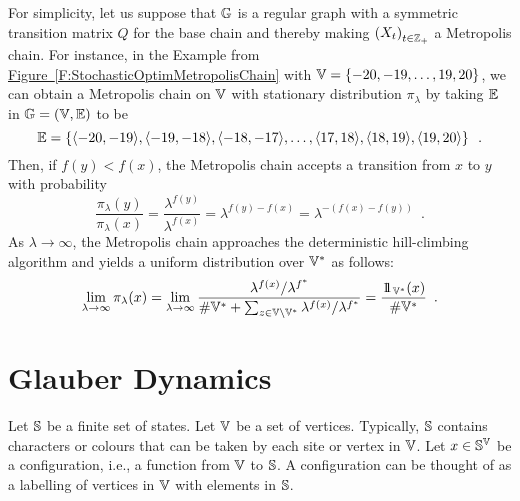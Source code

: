 \begin{example}
For simplicity, let us suppose that $\mathbb{G}$ is a regular graph with a symmetric transition matrix $Q$ for the base chain and thereby making $\left(X_t\right)_{t \in \mathbb{Z}_+}$ a Metropolis chain.  
For instance, in the Example from \hyperref[F:StochasticOptimMetropolisChain]{Figure~\ref*{F:StochasticOptimMetropolisChain}} with $\mathbb{V} = \{-20,-19,\ldots,19,20\}$, we can obtain a Metropolis chain on $\mathbb{V}$ with stationary distribution $\pi_{\lambda}$ by taking $\mathbb{E}$ in $\mathbb{G}=(\mathbb{V},\mathbb{E})$ to be 
\[
\mathbb{E} = \left\{ \langle -20,-19\rangle, \langle -19,-18\rangle, \langle -18,-17\rangle, \ldots, \langle 17,18\rangle, \langle 18,19\rangle, \langle 19,20\rangle \right\} \enspace .
\]
Then, if $f(y) < f(x)$, the Metropolis chain accepts a transition from $x$ to $y$ with probability 
$$\frac{\pi_{\lambda}(y)}{\pi_{\lambda}(x)} = \frac{\lambda^{f(y)}}{\lambda^{f(x)}}  = \lambda^{f(y)-f(x)} = \lambda^{-(f(x)-f(y))} \enspace .$$
As $\lambda \to \infty$, the Metropolis chain approaches the deterministic hill-climbing algorithm and yields a uniform distribution over $\mathbb{V}^*$ as follows:
\[
\lim_{\lambda \to \infty} \pi_{\lambda} (x) = \lim_{\lambda \to \infty} \frac{\lambda^{f(x)} / \lambda^{f^*}}{\#\Vz^* + \sum_{z \in \Vz \setminus \Vz^*}{\lambda^{f(x)}/\lambda^{f^*}}} = \frac{\BBs{1}_{\Vz^*}(x)}{\#\Vz^*} \enspace .
\]
\end{example}

\section{Glauber Dynamics}
Let $\mathbb{S}$ be a finite set of states. 
Let $\mathbb{V}$ be a set of vertices.  
Typically, $\mathbb{S}$ contains characters or colours that can be taken by each site or vertex in $\mathbb{V}$.  
Let $x \in \mathbb{S}^{\mathbb{V}}$ be a configuration, i.e., a function from $\mathbb{V}$ to $\mathbb{S}$.  
A configuration can be thought of as a labelling of vertices in $\mathbb{V}$ with elements in $\mathbb{S}$.

